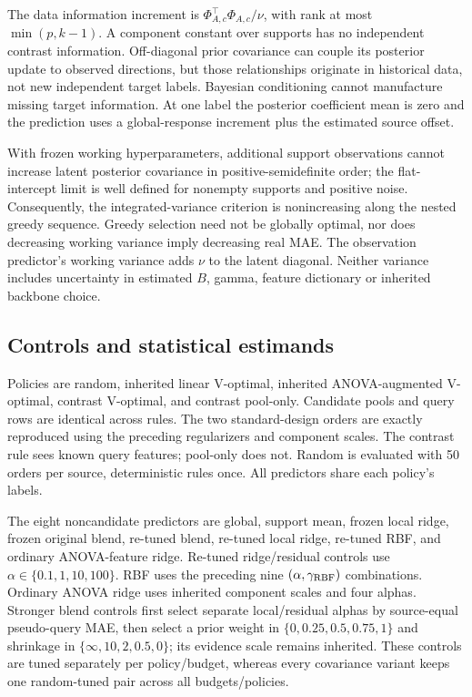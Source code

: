 The data information increment is $\Phi_{A,c}^\top\Phi_{A,c}/\nu$, with rank at most $\min(p,k-1)$. A component constant over supports has no independent contrast information. Off-diagonal prior covariance can couple its posterior update to observed directions, but those relationships originate in historical data, not new independent target labels. Bayesian conditioning cannot manufacture missing target information. At one label the posterior coefficient mean is zero and the prediction uses a global-response increment plus the estimated source offset.

With frozen working hyperparameters, additional support observations cannot increase latent posterior covariance in positive-semidefinite order; the flat-intercept limit is well defined for nonempty supports and positive noise. Consequently, the integrated-variance criterion is nonincreasing along the nested greedy sequence. Greedy selection need not be globally optimal, nor does decreasing working variance imply decreasing real MAE. The observation predictor's working variance adds $\nu$ to the latent diagonal. Neither variance includes uncertainty in estimated $B$, gamma, feature dictionary or inherited backbone choice.

\subsection{Controls and statistical estimands}
Policies are random, inherited linear V-optimal, inherited ANOVA-augmented V-optimal, contrast V-optimal, and contrast pool-only. Candidate pools and query rows are identical across rules. The two standard-design orders are exactly reproduced using the preceding regularizers and component scales. The contrast rule sees known query features; pool-only does not. Random is evaluated with 50 orders per source, deterministic rules once. All predictors share each policy's labels.

The eight noncandidate predictors are global, support mean, frozen local ridge, frozen original blend, re-tuned blend, re-tuned local ridge, re-tuned RBF, and ordinary ANOVA-feature ridge. Re-tuned ridge/residual controls use $\alpha\in\{0.1,1,10,100\}$. RBF uses the preceding nine $(\alpha,\gamma_{\rm RBF})$ combinations. Ordinary ANOVA ridge uses inherited component scales and four alphas. Stronger blend controls first select separate local/residual alphas by source-equal pseudo-query MAE, then select a prior weight in $\{0,0.25,0.5,0.75,1\}$ and shrinkage in $\{\infty,10,2,0.5,0\}$; its evidence scale remains inherited. These controls are tuned separately per policy/budget, whereas every covariance variant keeps one random-tuned pair across all budgets/policies.

